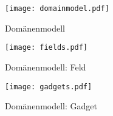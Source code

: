 \FloatBarrier
\begin{figure}[h]
    \centering
    \texttt{[image: domainmodel.pdf]}
    \caption{Domänenmodell}
\end{figure}

\FloatBarrier

\begin{figure}[h]
    \centering
    \texttt{[image: fields.pdf]}
    \caption{Domänenmodell: Feld}
\end{figure}
\FloatBarrier


\begin{figure}[h]
    \centering
    \texttt{[image: gadgets.pdf]}
    \caption{Domänenmodell: Gadget}
\end{figure}
\FloatBarrier

